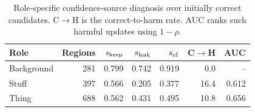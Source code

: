 \begin{table}[t]
\centering
\small
\caption{Role-specific confidence-source diagnosis over initially correct candidates. C$\rightarrow$H is the correct-to-harm rate. AUC ranks such harmful updates using $1-\rho$.}
\label{tab:role-source-diagnosis}
\begin{tabular}{lrrrrrr}
\toprule
Role & Regions & $s_{\rm keep}$ & $s_{\rm leak}$ & $s_{\rm cf}$ & C$\rightarrow$H & AUC \\
\midrule
Background & 281 & 0.799 & 0.742 & 0.919 & 0.0 & -- \\
Stuff & 397 & 0.566 & 0.205 & 0.377 & 16.4 & 0.612 \\
Thing & 688 & 0.562 & 0.431 & 0.495 & 10.8 & 0.656 \\
\bottomrule
\end{tabular}
\end{table}
